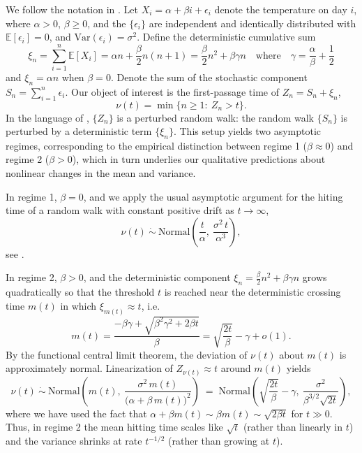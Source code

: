 \documentclass[
]{article}
\begin{document}
We follow the notation in \cite{gut2009stopped}. Let
\(X_i=\alpha+\beta i + \epsilon_i\) denote the temperature on day \(i\),
where \(\alpha>0\), \(\beta\ge 0\), and the \( \{\epsilon_i\} \) are 
independent and identically distributed with  
\(\mathbb{E}[\epsilon_i]=0\), and 
\(\mathrm{Var}(\epsilon_i)=\sigma^2\). Define the deterministic
cumulative sum \[
\xi_n=\sum_{i=1}^n \mathbb{E}[X_i]
=
\alpha n+\frac{\beta}{2}n(n+1)
=
\frac{\beta}{2}n^2+\beta\gamma n
\quad \text{where} \quad
\gamma=\frac{\alpha}{\beta}+\frac{1}{2}
\] and \(\xi_n=\alpha n\) when \(\beta=0\). Denote the sum of the
stochastic component \(S_n=\sum_{i=1}^n \epsilon_i\). Our object of
interest is the first-passage time of \( Z_n=S_n+\xi_n\), \[
\nu(t)=\min\{n\ge 1:\ Z_n>t\}.
\] In the language of \cite{lai1977nonlinear}, \(\{Z_n\}\) is a
perturbed random walk: the random walk \(\{S_n\}\) is perturbed by a
deterministic term \(\{\xi_n\}\). This setup yields two
asymptotic regimes, corresponding to the empirical distinction between
regime 1 (\(\beta\approx 0\)) and regime 2 (\(\beta>0\)), which in turn
underlies our qualitative predictions about nonlinear changes in the mean 
and variance.

In regime 1, \(\beta=0\), and we apply the usual asymptotic argument for
the hiting time of a random walk with constant positive drift as \(t \to \infty\), \[
\nu(t)\ \dot{\sim}\ \mathrm{Normal}\!\left(\frac{t}{\alpha},\ \frac{\sigma^2\,t}{\alpha^{3}}\right),
\] see \cite{gut2009stopped}.

In regime 2, \(\beta>0\), and the deterministic component
\(\xi_n=\frac{\beta}{2}n^2+\beta\gamma n\) grows quadratically so that
the threshold \(t\) is reached near the deterministic crossing time
\(m(t)\) in which \(\xi_{m(t)}\approx t\), i.e. \[
m(t)=\frac{-\beta\gamma+\sqrt{\beta^2\gamma^2+2\beta t}}{\beta}
=
\sqrt{\frac{2t}{\beta}}-\gamma+o(1).
\] By the functional central limit theorem, the deviation of \(\nu(t)\)
about \(m(t)\) is approximately normal. Linearization of
\(Z_{\nu(t)}\approx t\) around \(m(t)\) yields \[
\nu(t)\ \dot{\sim}\ \mathrm{Normal}\!\left(m(t),\ \frac{\sigma^2\,m(t)}{\bigl(\alpha+\beta\,m(t)\bigr)^2}\right)
\;=\;
\mathrm{Normal}\!\left(\sqrt{\frac{2t}{\beta}}-\gamma,\ \frac{\sigma^2}{\beta^{3/2}\sqrt{2t}}\right),
\] where we have used the fact that
\(\alpha+\beta m(t)\sim \beta m(t)\sim \sqrt{2\beta t}\) for
\(t \gg 0\). Thus, in regime 2 the mean hitting time scales like
\(\sqrt{t}\) (rather than linearly in \(t\)) and the variance shrinks at
rate \(t^{-1/2}\) (rather than growing at \(t
\)).
\end{document}
